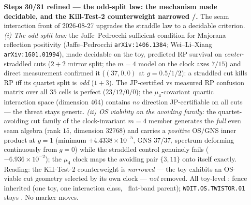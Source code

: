 \documentclass[11pt,a4paper]{article}
\theoremstyle{definition}
\begin{document}
\par\smallskip\noindent\textbf{Steps 30/31 refined --- the odd-split law: the mechanism made
decidable, and the Kill-Test-2 counterweight narrowed \mE/\mC.} The seam interaction front of
2026-08-27 upgrades the straddle law to a decidable criterion. \emph{(i) The odd-split law:}
the Jaffe--Pedrocchi sufficient condition for Majorana reflection positivity
(Jaffe--Pedrocchi \texttt{arXiv:1406.1384}; Wei--Li--Xiang \texttt{arXiv:1601.01994}), made
decidable on the toy, predicted RP survival on \emph{center}-straddled cuts ($2{+}2$ mirror
split; the $m=4$ model on the clock axes $7/15$) and direct measurement confirmed it
($(37,0,0)$ at $g=0.5/1/2$): a straddled cut kills RP iff its quartet split is \emph{odd}
($1{+}3$). The JP-certified vs measured RP confusion matrix over all $35$ cells is perfect
($23/12/0/0$); the $\mu_4$-covariant quartic interaction space (dimension $464$) contains
\emph{no} direction JP-certifiable on all cuts --- the threat stays generic. \emph{(ii) OS
viability on the avoiding family:} the quartet-avoiding cut family of the clock-invariant
$m=4$ member generates the \emph{full} even seam algebra (rank $15$, dimension $32768$) and
carries a \emph{positive} OS/GNS inner product at $g=1$ (minimum $+4.4338\times10^{-5}$, GNS
$37/37$, spectrum deforming continuously from $g=0$) while the straddled control genuinely
fails ($-6.936\times10^{-2}$); the $\mu_4$ clock maps the avoiding pair $\{3,11\}$ onto itself
exactly. Reading: the Kill-Test-2 counterweight is \emph{narrowed} --- the toy exhibits an
OS-viable cut geometry selected by its own clock --- \emph{not} removed. All toy-level \mE;
fence inherited (one toy, one interaction class, \mC\ flat-band parent);
\texttt{WOIT.OS.TWISTOR.01} stays \mO. No marker moves.
\end{document}
